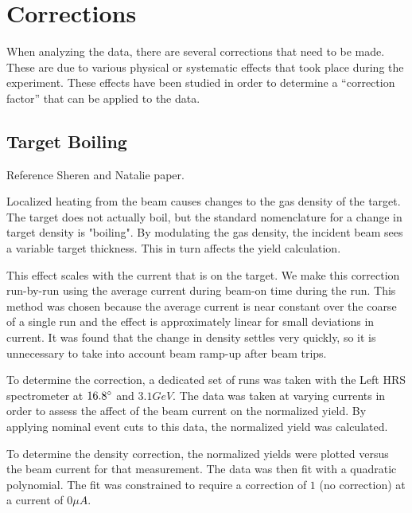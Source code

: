\section{Corrections}

When analyzing the data, there are several corrections that need to be made. These are due to various physical or systematic effects that took place during the experiment. These effects have been studied in order to determine a ``correction factor'' that can be applied to the data.

\subsection{Target Boiling}
\label{sec:boiling}

Reference Sheren and Natalie paper.

Localized heating from the beam causes changes to the gas density of the target. The target does not actually boil, but the standard nomenclature for a change in target density is "boiling". By modulating the gas density, the incident beam sees a variable target thickness. This in turn affects the yield calculation.

This effect scales with the current that is on the target. We make this correction run-by-run using the average current during beam-on time during the run. This method was chosen because the average current is near constant over the coarse of a single run and the effect is approximately linear for small deviations in current. It was found that the change in density settles very quickly, so it is unnecessary to take into account beam ramp-up after beam trips.

To determine the correction, a dedicated set of runs was taken with the Left HRS spectrometer at $16.8\degree$ and $3.1GeV$. The data was taken at varying currents in order to assess the affect of the beam current on the normalized yield. By applying nominal event cuts to this data, the normalized yield was calculated. 

To determine the density correction, the normalized yields were plotted versus the beam current for that measurement. The data was then fit with a quadratic polynomial. The fit was constrained to require a correction of $1$ (no correction) at a current of $0 \mu A$.

